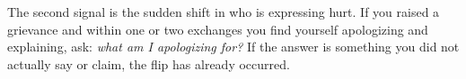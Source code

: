 \begin{remark}
The second signal is the sudden shift in who is expressing hurt.
If you raised a grievance and within one or two exchanges you find yourself apologizing and explaining, ask: \emph{what am I apologizing for?}
If the answer is something you did not actually say or claim, the flip has already occurred.
\end{remark}

